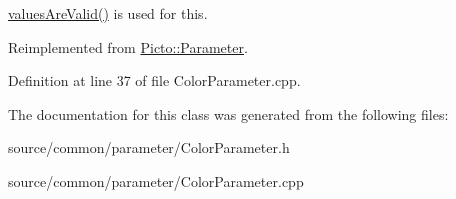 \hyperlink{class_picto_1_1_parameter_a3443808da4c3edf26f2c3c3772d95b10}{values\-Are\-Valid()} is used for this. 

Reimplemented from \hyperlink{class_picto_1_1_parameter_a94c0e4191ffcc0bd642b647d24557082}{Picto\-::\-Parameter}.



Definition at line 37 of file Color\-Parameter.\-cpp.



The documentation for this class was generated from the following files\-:\begin{DoxyCompactItemize}
\item 
source/common/parameter/Color\-Parameter.\-h\item 
source/common/parameter/Color\-Parameter.\-cpp\end{DoxyCompactItemize}
